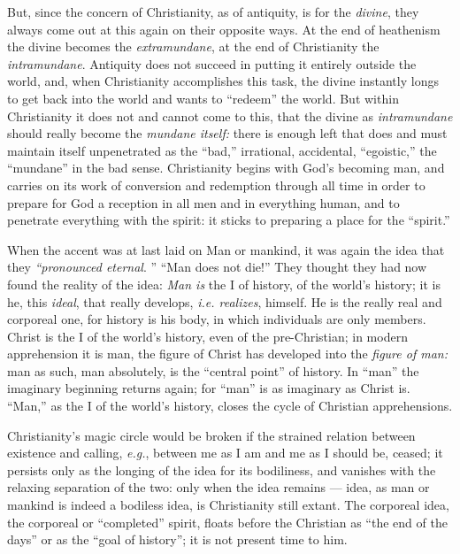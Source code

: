 But, since the concern of Christianity, as of antiquity, is for the 
\textit{divine}, they always come out at this again on their opposite ways. At 
the end of heathenism the divine becomes the \textit{extramundane}, at the end 
of Christianity the \textit{intramundane}. Antiquity does not succeed in 
putting it entirely outside the world, and, when Christianity accomplishes 
this task, the divine instantly longs to get back into the world and wants to 
``redeem'' the world. But within Christianity it does not and cannot come to 
this, that the divine as \textit{intramundane} should really become the 
\textit{mundane itself:} there is enough left that does and must maintain 
itself unpenetrated as the ``bad,'' irrational, accidental, ``egoistic,'' 
the ``mundane'' in the bad sense. Christianity begins with God's becoming 
man, and carries on its work of conversion and redemption through all time in 
order to prepare for God a reception in all men and in everything human, and 
to penetrate everything with the spirit: it sticks to preparing a place for 
the ``spirit.''

When the accent was at last laid on Man or mankind, it was again the idea that 
they \textit{``pronounced eternal}. '' ``Man does not die!'' They thought 
they had now found the reality of the idea: \textit{Man is} the I of history, 
of the world's history; it is he, this \textit{ideal}, that really develops, 
\textit{i.e. realizes}, himself. He is the really real and corporeal one, for 
history is his body, in which individuals are only members. Christ is the I of 
the world's history, even of the pre-Christian; in modern apprehension it is 
man, the figure of Christ has developed into the \textit{figure of man:} man 
as such, man absolutely, is the ``central point'' of history. In ``man'' 
the imaginary beginning returns again; for ``man'' is as imaginary as Christ 
is. ``Man,'' as the I of the world's history, closes the cycle of Christian 
apprehensions.

Christianity's magic circle would be broken if the strained relation between 
existence and calling, \textit{e.g.}, between me as I am and me as I should 
be, ceased; it persists only as the longing of the idea for its bodiliness, 
and vanishes with the relaxing separation of the two: only when the idea 
remains --- idea, as man or mankind is indeed a bodiless idea, is Christianity 
still extant. The corporeal idea, the corporeal or ``completed'' spirit, 
floats before the Christian as ``the end of the days'' or as the ``goal of 
history''; it is not present time to him.

